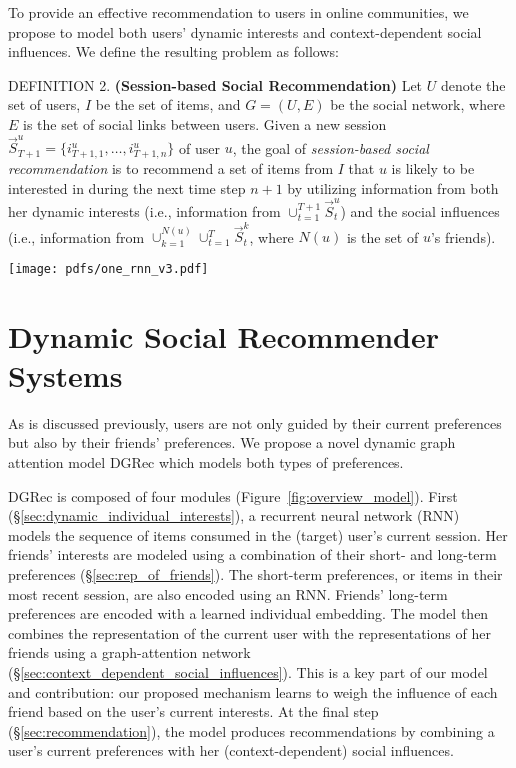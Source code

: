 \documentclass[sigconf]{acmart}
\begin{document}
To provide an effective recommendation to users in online communities, we propose to model both users' dynamic interests and context-dependent social influences. We define the resulting problem as follows:

\textup{DEFINITION 2.} \textbf{(Session-based Social Recommendation)} Let $U$ denote the set of users, $I$ be the set of items, and $G=(U, E)$ be the social network, where $E$ is the set of social links between users. Given a new session $\vec{S}_{T+1}^u=\{i_{T+1,1}^{u},\ldots, i_{T+1,n}^{u}\}$ of user $u$, the goal of \emph{session-based social recommendation} is to recommend a set of items from $I$ that $u$ is likely to be interested in during the next time step $n+1$ by utilizing information from both her dynamic interests (i.e., information from $\cup_{t=1}^{T+1}\vec{S}_t^u$) and the social influences (i.e., information from $\cup_{k=1}^{N(u)}\cup_{t=1}^{T}\vec{S}_t^k$, where $N(u)$ is the set of $u$'s friends).
 
\begin{figure*}
\centering
\texttt{[image: pdfs/one\_rnn\_v3.pdf]}
\vspace{-8pt}
\caption{A schematic view of our proposed model for dynamic social recommendation. 
}
\label{fig:overview_model}
\end{figure*}

\section{Dynamic Social Recommender Systems}
As is discussed previously, users are not only guided by their current preferences but also by their friends' preferences. 
We propose a novel dynamic graph attention model \gls{DGRec} which models both types of preferences. 

\gls{DGRec} is composed of four modules (Figure~\ref{fig:overview_model}).
First (\S \ref{sec:dynamic_individual_interests}), a recurrent neural network (RNN)~\cite{elman1990finding} models the sequence of items consumed in the (target) user's current session. 
Her friends' interests are modeled using a combination of their short- and long-term preferences (\S \ref{sec:rep_of_friends}).
The short-term preferences, or items in their most recent session, are also encoded using an RNN. Friends' long-term preferences are encoded with a learned individual embedding.
The model then combines the representation of the current user with the representations of her friends using a graph-attention network (\S \ref{sec:context_dependent_social_influences}). This is a key part of our model and contribution: our proposed mechanism learns to weigh the influence of each friend based on the user's current interests.
At the final step (\S \ref{sec:recommendation}), the model produces recommendations by combining a user's current preferences with her (context-dependent) social influences.
\end{document}
